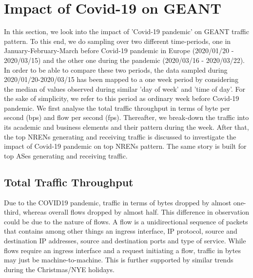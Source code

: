 \documentclass[10pt, journal, letterpaper]{IEEEtran}
\begin{document}
\section{Impact of Covid-19 on GEANT}
In this section, we look into the impact of 'Covid-19 pandemic' on GEANT traffic pattern. To this end, we do sampling over two different time-periods, one in January-February-March before Covid-19 pandemic in Europe (2020/01/20 - 2020/03/15) and the other one during the pandemic (2020/03/16 - 2020/03/22). In order to be able to compare these two periods, the data sampled during 2020/01/20-2020/03/15 has been mapped to a one week period by considering the median of values observed during similar 'day of week' and 'time of day'. For the sake of simplicity, we refer to this period as ordinary week before Covid-19 pandemic. We first analyse the total traffic throughput in terms of byte per second (bps) and flow per second (fps). Thereafter, we break-down the traffic into its academic and business elements and their pattern during the week. After that, the top NRENs generating and receiving traffic is discussed to investigate the impact of Covid-19 pandemic on top NRENs pattern. The same story is built for top ASes generating and receiving traffic.

\subsection{Total Traffic Throughput}
Due to the COVID19 pandemic, traffic in terms of bytes dropped by almost one-third, whereas overall flows dropped by almost half. This difference in observation could be due to the nature of flows. A flow is a unidirectional sequence of packets that contains among other things an ingress interface, IP protocol, source and destination IP addresses, source and destination ports and type of service. While flows require an ingress interface and a request initiating a flow, traffic in bytes may just be machine-to-machine. This is further supported by similar trends during the Christmas/NYE holidays.
\end{document}
